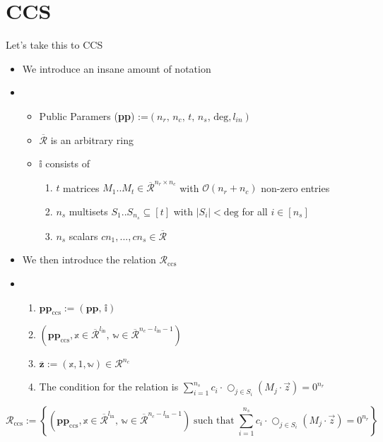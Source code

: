 \section{CCS}
\begin{frame}
    {Let's take this to CCS}
    \begin{itemize}
        \item We introduce an insane amount of notation
        \item \begin{itemize}

                  \item Public Paramers (\textbf{pp}) :=$(n_{r}, \, n_{c}, \,t,\,n_{s}, \, \text{deg}, l_{in})$
                  \item $\overline{\mathcal{R}}$ is an arbitrary ring
                  \item $\mathbb{i}$ consists of \begin{enumerate}
                            \item $t$ matrices $M_1..M_t \in \overline{\mathcal{R}}^{n_{r} \times n_{c}}$ with $\mathcal{O}(n_{r} + n_{c})$ non-zero entries
                            \item $n_{s}$ multisets $S_1..S_{n_s} \subseteq [t]$ with $|S_i| < \text{deg}$ for all $i \in [n_s]$
                            \item $n_s$ scalars $c{n_1}, ..., c{n_s} \in \overline{\mathcal{R}}$
                        \end{enumerate}
              \end{itemize}
        \item We then introduce the relation $\mathcal{R}_{\text{ccs}}$
        \item \begin{enumerate}
                  \item $\textbf{pp}_{\text{ccs}}:= (\textbf{pp},\, \mathbb{i})$
                  \item $(\textbf{pp}_{\text{ccs}}, \mathbb{x} \in \overline{\mathcal{R}}^{l_\text{in}},\,\mathbb{w} \in \overline{\mathcal{R}}^{n_c- l_\text{in} -1})$
                  \item $\overline{\textbf{z}} := (\mathbb{x}, 1,\mathbb{w}) \in \mathcal{R}^{n_c}$
                  \item The condition for the relation is $\sum_{i=1}^{n_s} c_i \cdot \bigcirc_{j \in S_i} (M_j \cdot \vec{z}) = 0^{n_r}$
              \end{enumerate}


    \end{itemize}
    \[
        \mathcal{R}_{\text{ccs}} := \left\{ (\textbf{pp}_{\text{ccs}}, \mathbb{x} \in \overline{\mathcal{R}}^{l_\text{in}},\, \mathbb{w} \in \overline{\mathcal{R}}^{n_c - l_\text{in} - 1}) \; \text{such that} \; \sum_{i=1}^{n_s} c_i \cdot \bigcirc_{j \in S_i} (M_j \cdot \vec{z}) = 0^{n_r} \right\}
    \]

\end{frame}
